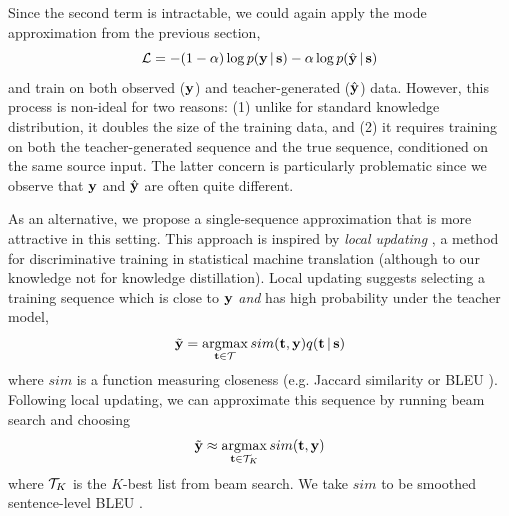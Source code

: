 \documentclass[11pt,letterpaper]{article}
\DeclareMathOperator*{\argmax}{argmax}
\begin{document}
Since the second term is intractable, we could again apply the mode
approximation from the previous section,
\begin{equation*}
\mathcal{L} = -(1-\alpha)\log p(\mathbf{y} \,|\, \mathbf{s})  - \alpha \log p (\hat{\mathbf{y}} \,|\, \mathbf{s})
\end{equation*}
and train on both observed ($\mathbf{y}$) and teacher-generated ($\hat{\mathbf{y}}$) data.
However, this process is non-ideal for two reasons: (1) unlike for
standard knowledge distribution, it doubles the size of the training
data, and (2) it requires training on both the
teacher-generated sequence and the true sequence, conditioned on the
same source input. The latter concern is particularly problematic since we observe 
that $\mathbf{y}$ and $\hat{\mathbf{y}}$ are often quite different.   

As an alternative, we propose a single-sequence approximation that
is more attractive in this setting. This approach is inspired by
\textit{local updating} \cite{Liang2006}, a method
 for discriminative training in statistical
machine translation (although to our knowledge not for knowledge
distillation). Local updating suggests selecting a training sequence which is
close to $\mathbf{y}$ \textit{and} has high probability under the teacher
model,
\begin{equation*}
\tilde{\yvec} = \argmax_{\tvec \in \mcT} sim(\tvec, \yvec) q(\tvec \given \svec)
\end{equation*}
where $sim$ is a function measuring closeness (e.g. Jaccard
similarity or  BLEU \cite{Papineni2002}). Following local updating, we can approximate this 
sequence by running beam search and choosing
\begin{equation*}
\tilde{\yvec} \approx \argmax_{\tvec \in \mcT_K} sim(\tvec, \yvec)
\end{equation*}
where $\mathcal{T}_K$ is the $K$-best list from beam search. We take $sim$ to be smoothed
sentence-level BLEU \cite{Chen2014}.
\end{document}
